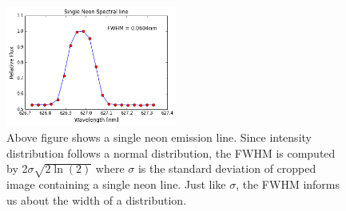 \documentclass[authoryear, 12pt,5p, times]{elsarticle}
\begin{document}
\\
\begin{figure}[h!]
\includegraphics[width=0.5\textwidth]{figures/single_neon}
\caption{Above figure shows a single neon emission line. Since intensity distribution follows a normal distribution, the FWHM is computed by 2$\sigma\sqrt{2\ln(2)}$ where $\sigma$ is the standard deviation of cropped image containing a single neon line. Just like $\sigma$, the FWHM informs us about the width of a distribution. }
\label{lambda_direction}
\end{figure}
\end{document}
